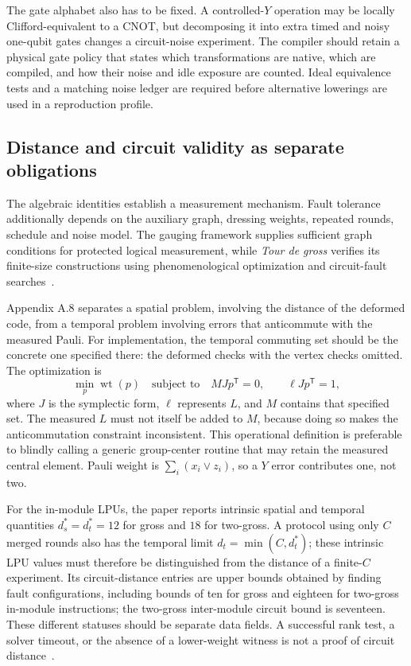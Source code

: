 \documentclass[11pt,a4paper]{article}
\newcommand{\wt}{\operatorname{wt}}
\begin{document}
The gate alphabet also has to be fixed. A controlled-$Y$ operation may be locally Clifford-equivalent to a CNOT, but decomposing it into extra timed and noisy one-qubit gates changes a circuit-noise experiment. The compiler should retain a physical gate policy that states which transformations are native, which are compiled, and how their noise and idle exposure are counted. Ideal equivalence tests and a matching noise ledger are required before alternative lowerings are used in a reproduction profile.

\subsection{Distance and circuit validity as separate obligations}

The algebraic identities establish a measurement mechanism. Fault tolerance additionally depends on the auxiliary graph, dressing weights, repeated rounds, schedule and noise model. The gauging framework supplies sufficient graph conditions for protected logical measurement, while \emph{Tour de gross} verifies its finite-size constructions using phenomenological optimization and circuit-fault searches~\cite{gauging,tdg}.

Appendix A.8 separates a spatial problem, involving the distance of the deformed code, from a temporal problem involving errors that anticommute with the measured Pauli. For implementation, the temporal commuting set should be the concrete one specified there: the deformed checks with the vertex checks omitted. The optimization is
\begin{equation}
 \min_{p}\wt(p)\quad\text{subject to}\quad
 M J p^{\mathsf T}=0,\qquad \ell J p^{\mathsf T}=1,
 \label{eq:distance}
\end{equation}
where $J$ is the symplectic form, $\ell$ represents $L$, and $M$ contains that specified set. The measured $L$ must not itself be added to $M$, because doing so makes the anticommutation constraint inconsistent. This operational definition is preferable to blindly calling a generic group-center routine that may retain the measured central element. Pauli weight is $\sum_i(x_i\lor z_i)$, so a $Y$ error contributes one, not two.

For the in-module LPUs, the paper reports intrinsic spatial and temporal quantities $d_s^*=d_t^*=12$ for gross and $18$ for two-gross. A protocol using only $C$ merged rounds also has the temporal limit $d_t=\min(C,d_t^*)$; these intrinsic LPU values must therefore be distinguished from the distance of a finite-$C$ experiment. Its circuit-distance entries are upper bounds obtained by finding fault configurations, including bounds of ten for gross and eighteen for two-gross in-module instructions; the two-gross inter-module circuit bound is seventeen. These different statuses should be separate data fields. A successful rank test, a solver timeout, or the absence of a lower-weight witness is not a proof of circuit distance~\cite{tdg}.
\end{document}
